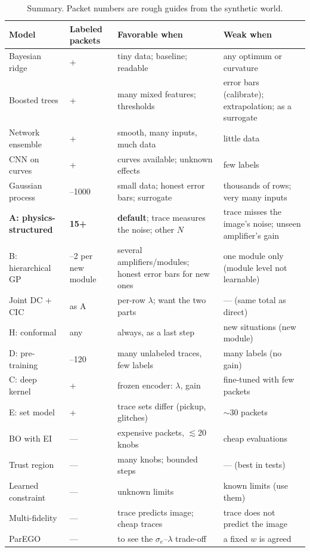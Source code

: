 \documentclass[11pt]{article}
\begin{document}
\begin{table}[H]
\centering\small
\begin{tabularx}{\textwidth}{>{\raggedright\arraybackslash}p{3.1cm}>{\raggedright\arraybackslash}p{2.3cm}>{\raggedright\arraybackslash}X>{\raggedright\arraybackslash}X}
\toprule
Model & Labeled packets & Favorable when & Weak when \\
\midrule
Bayesian ridge & 20+ & tiny data; baseline; readable & any optimum or curvature \\
Boosted trees & 100+ & many mixed features; thresholds & error bars (calibrate); extrapolation; as a surrogate \\
Network ensemble & 300+ & smooth, many inputs, much data & little data \\
CNN on curves & 240+ & curves available; unknown effects & few labels \\
Gaussian process & 10--1000 & small data; honest error bars; surrogate & thousands of rows; very many inputs \\
\textbf{A: physics-structured} & \textbf{15+} & \textbf{default}; trace measures the noise; other $N$ & trace misses the image's noise; unseen amplifier's gain \\
B: hierarchical GP & 1--2 per new module & several amplifiers/modules; honest error bars for new ones & one module only (module level not learnable) \\
Joint DC + CIC & as A & per-row $\lambda$; want the two parts & --- (same total as direct) \\
H: conformal & any & always, as a last step & new situations (new module) \\
D: pre-training & 30--120 & many unlabeled traces, few labels & many labels (no gain) \\
C: deep kernel & 60+ & frozen encoder: $\lambda$, gain & fine-tuned with few packets \\
E: set model & 60+ & trace sets differ (pickup, glitches) & $\sim$30 packets \\
\midrule
BO with EI & --- & expensive packets, $\lesssim$20 knobs & cheap evaluations \\
Trust region & --- & many knobs; bounded steps & --- (best in tests) \\
Learned constraint & --- & unknown limits & known limits (use them) \\
Multi-fidelity & --- & trace predicts image; cheap traces & trace does not predict the image \\
ParEGO & --- & to see the $\sigma_e$--$\lambda$ trade-off & a fixed $w$ is agreed \\
\bottomrule
\end{tabularx}
\caption{Summary. Packet numbers are rough guides from the synthetic world.}
\end{table}
\end{document}
